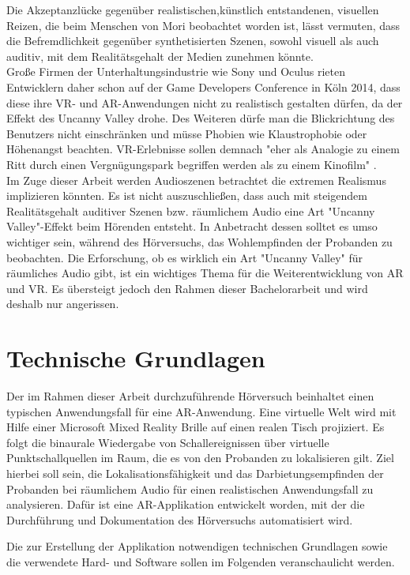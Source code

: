 Die Akzeptanzlücke gegenüber realistischen,künstlich entstandenen, visuellen Reizen, die beim Menschen von Mori beobachtet worden ist, lässt vermuten, dass die Befremdlichkeit gegenüber synthetisierten Szenen, sowohl visuell als auch auditiv, mit dem Realitätsgehalt der Medien zunehmen könnte. \\ 

Große Firmen der Unterhaltungsindustrie wie Sony und Oculus rieten Entwicklern daher schon auf der Game Developers Conference in Köln 2014, dass diese ihre VR- und AR-Anwendungen nicht zu realistisch gestalten dürfen, da der Effekt des Uncanny Valley drohe. Des Weiteren dürfe man die Blickrichtung des Benutzers nicht einschränken und müsse Phobien wie Klaustrophobie oder Höhenangst beachten. VR-Erlebnisse sollen demnach "eher als Analogie zu einem Ritt durch einen Vergnügungspark begriffen werden als zu einem Kinofilm" \cite{Gieselmann}. \\
 
 Im Zuge dieser Arbeit werden Audioszenen betrachtet die extremen Realismus implizieren könnten. Es ist nicht auszuschließen, dass auch mit steigendem Realitätsgehalt auditiver Szenen bzw. räumlichem Audio eine Art "Uncanny Valley"-Effekt beim Hörenden entsteht. In Anbetracht dessen solltet es umso wichtiger sein, während des Hörversuchs, das Wohlempfinden der Probanden zu beobachten.  Die Erforschung, ob es wirklich ein Art "Uncanny Valley" für räumliches Audio gibt, ist ein wichtiges Thema für die Weiterentwicklung von AR und VR. Es übersteigt jedoch den Rahmen dieser Bachelorarbeit und wird deshalb nur angerissen.
 
 \chapter{Technische Grundlagen}
Der im Rahmen dieser Arbeit durchzuführende Hörversuch beinhaltet einen typischen Anwendungsfall für eine AR-Anwendung. Eine virtuelle Welt wird mit Hilfe einer Microsoft Mixed Reality Brille auf einen realen Tisch projiziert.  Es folgt die binaurale Wiedergabe von Schallereignissen über virtuelle Punktschallquellen im Raum, die es von den Probanden zu lokalisieren gilt. Ziel hierbei soll sein, die Lokalisationsfähigkeit und das Darbietungsempfinden der Probanden bei räumlichem Audio für einen realistischen Anwendungsfall zu analysieren. Dafür ist eine AR-Applikation entwickelt worden, mit der die Durchführung und Dokumentation des Hörversuchs automatisiert wird.

Die zur Erstellung der Applikation notwendigen technischen Grundlagen sowie die verwendete Hard- und Software sollen im Folgenden veranschaulicht werden. 

